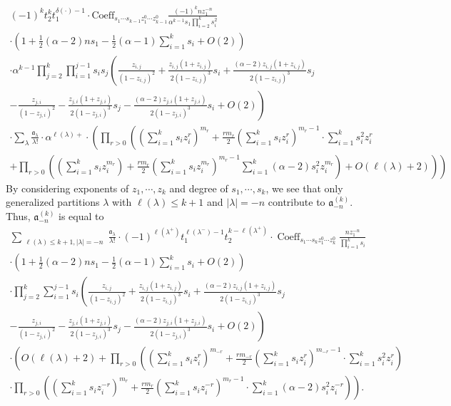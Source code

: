 \documentclass{article}
\renewcommand{\frak}[1]{\mathfrak{#1}}
\newcommand{\lr}[1]{\left({#1}\right)}
\DeclareMathOperator{\Coeff}{Coeff}
\begin{document}
\begin{gather*}
(-1)^k t_2^k t_1^{\delta(\cdot)-1} \cdot \mathrm{Coeff}_{s_1 \cdots s_{k-1} z_1^{0} \cdots z^0_{k-1} } \frac{(-1)^k n z_1^{-n}}{\alpha^{k-1} s_1 \prod_{i=2}^k s_i^2} \\
\cdot \left(1 + \frac{1}{2}(\alpha - 2) n s_1 - \frac{1}{2}(\alpha - 1) \sum_{i=1}^k s_i + O(2)\right) \\
\cdot \alpha^{k-1} \prod_{j=2}^k \prod_{i=1}^{j-1} s_i s_j \left( \frac{z_{i,j}}{(1 - z_{i,j})^2} + \frac{z_{i,j}(1 + z_{i,j})}{2(1 - z_{i,j})^3} s_i + \frac{(\alpha - 2) z_{i,j}(1 + z_{i,j})}{2(1 - z_{i,j})^3} s_j \right. \\
\left. - \frac{z_{j,i}}{(1 - z_{j,i})^2} - \frac{z_{j,i}(1 + z_{j,i})}{2(1 - z_{j,i})^3} s_j - \frac{(\alpha - 2) z_{j,i}(1 + z_{j,i})}{2(1 - z_{j,i})^3} s_i + O(2) \right) \\
\cdot \sum_\lambda \frac{\mathfrak{a}_\lambda}{\lambda!} \cdot \alpha^{\ell(\lambda)+} \cdot \left( \prod_{r>0} \left( \left( \sum_{i=1}^k s_i z_i^r \right)^{m_r} + \frac{r m_r}{2} \left( \sum_{i=1}^k s_i z_i^r \right)^{m_r - 1} \cdot \sum_{i=1}^k s_i^2 z_i^r \right. \right. \\
\left. \left. + \prod_{r>0} \left( \left( \sum_{i=1}^k s_i z_i^{m_r} \right) + \frac{r m_r}{2} \left( \sum_{i=1}^k s_i z_i^{m_r} \right)^{m_r - 1} \sum_{i=1}^k (\alpha - 2) s_i^2 z_i^{m_r} \right) + O(\ell(\lambda) + 2) \right) \right)
\end{gather*}
By considering exponents of $z_1,\cdots,z_k$ and degree of $s_1,\cdots, s_k$, we see that only generalized partitions $\lambda$ with $\ell(\lambda)\leq k+1$ and $|\lambda|=-n$ contribute to $\frak{a}_{-n}^{(k)}$. Thus, $\frak{a}_{-n}^{(k)}$ is equal to
\begin{gather*}
\sum_{\substack{\ell(\lambda) \leq k+1, |\lambda| = -n}} \frac{\mathfrak{a}_\lambda}{\lambda!} \cdot (-1)^{\ell(\lambda^+)} t_1^{\ell(\lambda^-)-1} t_2^{k - \ell(\lambda^+)} \cdot \Coeff_{s_1 \cdots s_{k} z_1^{0} \cdots z_k^0} \frac{n z_1^{-n}}{\prod_{i=1}^k s_i} \\
\cdot \left(1 + \frac{1}{2}(\alpha - 2)n s_1 - \frac{1}{2}(\alpha - 1)\sum_{i=1}^k s_i + O(2)\right)\\
\cdot \prod_{j=2}^k \sum_{i=1}^{j-1} s_i \left( \frac{z_{i,j}}{(1 - z_{i,j})^2} + \frac{z_{i,j}(1 + z_{i,j})}{2(1 - z_{i,j})^3} s_i + \frac{(\alpha - 2)z_{i,j}(1 + z_{i,j})}{2(1 - z_{i,j})^3} s_j \right. \\
\left. - \frac{z_{j,i}}{(1 - z_{j,i})^2} - \frac{z_{j,i}(1 + z_{j,i})}{2(1 - z_{j,i})^3} s_j - \frac{(\alpha - 2)z_{j,i}(1 + z_{j,i})}{2(1 - z_{j,i})^3} s_i + O(2) \right) \\
\cdot \left(
O(\ell(\lambda) + 2) + \prod_{r>0} \lr{
\lr{\sum_{i=1}^k s_i z_i^r}^{m_{-r}} + \frac{r m_{-r}}{2} \lr{\sum_{i=1}^k s_i z_i^r}^{m_{-r} - 1} \cdot \sum_{i=1}^k s_i^2 z_i^r
}
\right.
\\
\left.
\cdot \prod_{r>0}  \lr{
\lr{\sum_{i=1}^k s_i z_i^{-r}}^{m_r}  + \frac{r m_r}{2} \lr{\sum_{i=1}^k s_i z_i^{-r} }^{m_r - 1}\cdot\sum_{i=1}^k (\alpha - 2) s_i^2 z_i^{-r}
}
\right).
\end{gather*}
\end{document}

